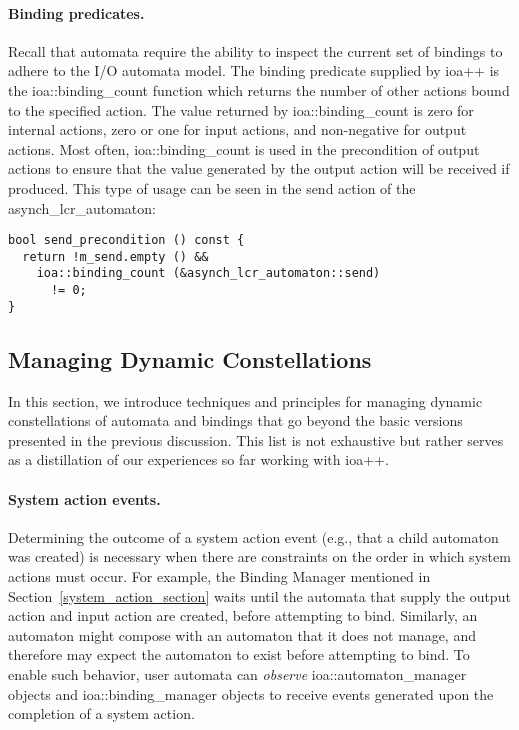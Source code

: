 \paragraph*{Binding predicates.}
Recall that automata require the ability to inspect the current set of bindings to adhere to the I/O automata model.
The binding predicate supplied by ioa++ is the ioa::binding\_count function which returns the number of other actions bound to the specified action.
The value returned by ioa::binding\_count is zero for internal actions, zero or one for input actions, and non-negative for output actions.
Most often, ioa::binding\_count is used in the precondition of output actions to ensure that the value generated by the output action will be received if produced.
\ifjournal
This type of usage can be seen in the send action of the asynch\_lcr\_automaton:
\begin{lstlisting}
bool send_precondition () const {
  return !m_send.empty () &&
    ioa::binding_count (&asynch_lcr_automaton::send)
      != 0;
}
\end{lstlisting}
\fi

\subsection{Managing Dynamic Constellations\label{constellations}}

In this section, we introduce techniques and principles for managing dynamic constellations of automata and bindings that go beyond the basic versions presented in the previous discussion.
This list is not exhaustive but rather serves as a distillation of our experiences so far working with ioa++.

\paragraph*{System action events.}
Determining the outcome of a system action event (e.g., that a child automaton was created) is necessary when there are constraints on the order in which system actions must occur.
For example, the Binding Manager mentioned in Section~\ref{system_action_section} waits until the automata that supply the output action and input action are created, before attempting to bind.
Similarly, an automaton might compose with an automaton that it does not manage, and therefore may expect the automaton to exist before attempting to bind.
To enable such behavior, user automata can \emph{observe} ioa::automaton\_manager objects and ioa::binding\_manager objects to receive events generated upon the completion of a system action.


